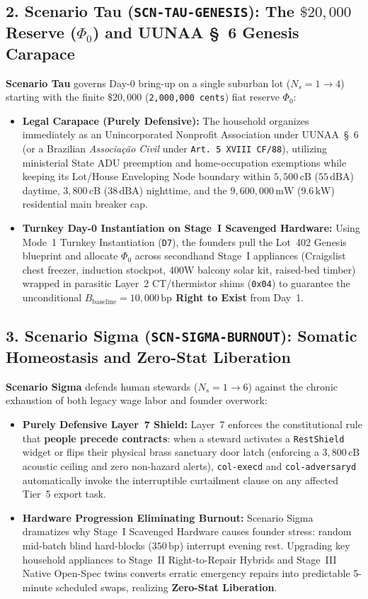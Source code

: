 \subsection{2. Scenario Tau (\texttt{SCN-TAU-GENESIS}): The $\$20{,}000$ Reserve ($\Phi_0$) and UUNAA \S~6 Genesis Carapace}
\textbf{Scenario Tau} governs Day-0 bring-up on a single suburban lot ($N_s = 1 \to 4$) starting with the finite $\$20{,}000$ (\texttt{2,000,000 cents}) fiat reserve $\Phi_0$:
\begin{itemize}
    \item \textbf{Legal Carapace (Purely Defensive):} The household organizes immediately as an Unincorporated Nonprofit Association under UUNAA~\S~6 (or a Brazilian \textit{Associa{\c{c}}{\~a}o Civil} under \texttt{Art.~5{\textordmasculine} XVIII CF/88}), utilizing ministerial State ADU preemption and home-occupation exemptions while keeping its Lot/House Enveloping Node boundary within $5{,}500\,\mathrm{cB}$ ($55\,\mathrm{dBA}$) daytime, $3{,}800\,\mathrm{cB}$ ($38\,\mathrm{dBA}$) nighttime, and the $9{,}600{,}000\,\mathrm{mW}$ ($9.6\,\mathrm{kW}$) residential main breaker cap.
    \item \textbf{Turnkey Day-0 Instantiation on Stage~I Scavenged Hardware:} Using Mode~1 Turnkey Instantiation (\texttt{D7}), the founders pull the Lot~402 Genesis blueprint and allocate $\Phi_0$ across secondhand Stage~I appliances (Craigslist chest freezer, induction stockpot, 400W balcony solar kit, raised-bed timber) wrapped in parasitic Layer~2 CT/thermistor shims (\texttt{0x04}) to guarantee the unconditional \textbf{$B_{\mathrm{baseline}} = 10{,}000\,\mathrm{bp}$ Right to Exist} from Day~1.
\end{itemize}

\subsection{3. Scenario Sigma (\texttt{SCN-SIGMA-BURNOUT}): Somatic Homeostasis and Zero-Stat Liberation}
\textbf{Scenario Sigma} defends human stewards ($N_s = 1 \to 6$) against the chronic exhaustion of both legacy wage labor and founder overwork:
\begin{itemize}
    \item \textbf{Purely Defensive Layer~7 Shield:} Layer~7 enforces the constitutional rule that \textbf{people precede contracts}: when a steward activates a \texttt{RestShield} widget or flips their physical brass sanctuary door latch (enforcing a $3{,}800\,\mathrm{cB}$ acoustic ceiling and zero non-hazard alerts), \texttt{col-execd} and \texttt{col-adversaryd} automatically invoke the interruptible curtailment clause on any affected Tier~5 export task.
    \item \textbf{Hardware Progression Eliminating Burnout:} Scenario Sigma dramatizes why Stage~I Scavenged Hardware causes founder stress: random mid-batch blind hard-blocks ($350\,\mathrm{bp}$) interrupt evening rest. Upgrading key household appliances to Stage~II Right-to-Repair Hybrids and Stage~III Native Open-Spec twins converts erratic emergency repairs into predictable 5-minute scheduled swaps, realizing \textbf{Zero-Stat Liberation}.
\end{itemize}

